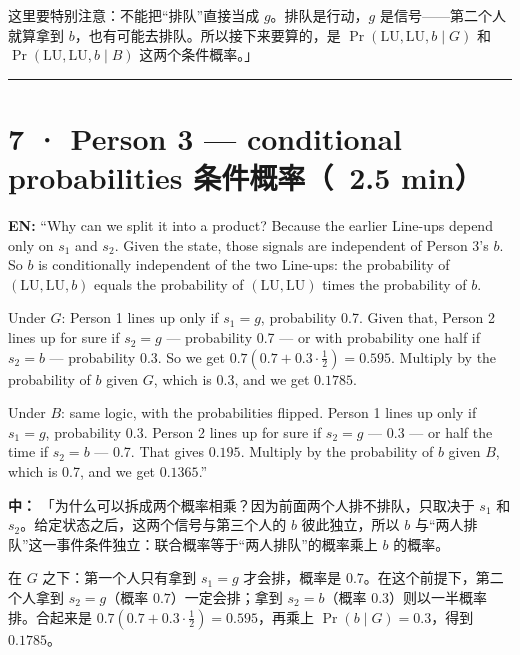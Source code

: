 \documentclass[11pt]{article}
\begin{document}
这里要特别注意：不能把“排队”直接当成 \(g\)。排队是行动，\(g\) 是信号——第二个人就算拿到 \(b\)，也有可能去排队。所以接下来要算的，是 \(\Pr(\mathrm{LU},\mathrm{LU},b\mid G)\) 和 \(\Pr(\mathrm{LU},\mathrm{LU},b\mid B)\) 这两个条件概率。」\par

\vspace{0.35em}\noindent\rule{\textwidth}{0.3pt}\par

\section*{7 · Person 3 — conditional probabilities 条件概率（~2.5 min）}

\textbf{EN:} “Why can we split it into a product? Because the earlier Line-ups depend only on \(s_1\) and \(s_2\). Given the state, those signals are independent of Person 3's \(b\). So \(b\) is conditionally independent of the two Line-ups: the probability of \((\mathrm{LU},\mathrm{LU},b)\) equals the probability of \((\mathrm{LU},\mathrm{LU})\) times the probability of \(b\).\par

Under \(G\): Person 1 lines up only if \(s_1=g\), probability 0.7. Given that, Person 2 lines up for sure if \(s_2=g\) — probability 0.7 — or with probability one half if \(s_2=b\) — probability 0.3. So we get \(0.7(0.7+0.3\cdot\tfrac12)=0.595\). Multiply by the probability of \(b\) given \(G\), which is 0.3, and we get \(0.1785\).\par

Under \(B\): same logic, with the probabilities flipped. Person 1 lines up only if \(s_1=g\), probability 0.3. Person 2 lines up for sure if \(s_2=g\) — 0.3 — or half the time if \(s_2=b\) — 0.7. That gives \(0.195\). Multiply by the probability of \(b\) given \(B\), which is 0.7, and we get \(0.1365\).”\par

\textbf{中：} 「为什么可以拆成两个概率相乘？因为前面两个人排不排队，只取决于 \(s_1\) 和 \(s_2\)。给定状态之后，这两个信号与第三个人的 \(b\) 彼此独立，所以 \(b\) 与“两人排队”这一事件条件独立：联合概率等于“两人排队”的概率乘上 \(b\) 的概率。\par

在 \(G\) 之下：第一个人只有拿到 \(s_1=g\) 才会排，概率是 \(0.7\)。在这个前提下，第二个人拿到 \(s_2=g\)（概率 \(0.7\)）一定会排；拿到 \(s_2=b\)（概率 \(0.3\)）则以一半概率排。合起来是 \(0.7(0.7+0.3\cdot\tfrac12)=0.595\)，再乘上 \(\Pr(b\mid G)=0.3\)，得到 \(0.1785\)。\par
\end{document}
